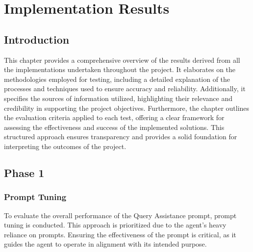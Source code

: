 \chapter{Implementation Results}




\section{Introduction}
This chapter provides a comprehensive overview of the results derived from all the implementations undertaken throughout the project. It elaborates on the methodologies employed for testing, including a detailed explanation of the processes and techniques used to ensure accuracy and reliability. Additionally, it specifies the sources of information utilized, highlighting their relevance and credibility in supporting the project objectives. Furthermore, the chapter outlines the evaluation criteria applied to each test, offering a clear framework for assessing the effectiveness and success of the implemented solutions. This structured approach ensures transparency and provides a solid foundation for interpreting the outcomes of the project.

\section{Phase 1}
    \subsection{Prompt Tuning}
    To evaluate the overall performance of the Query Assistance prompt, prompt tuning is conducted. This approach is prioritized due to the agent's heavy reliance on prompts. Ensuring the effectiveness of the prompt is critical, as it guides the agent to operate in alignment with its intended purpose.

